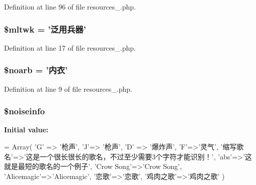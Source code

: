 Definition at line 96 of file resources\+\_.\+php.

\hypertarget{resources__1_8php_af12f55cfe5805f1081499f04e700478a}{
\subsubsection[{\$mltwk}]{\setlength{\rightskip}{0pt plus 5cm}\$mltwk = '泛用兵器'}}\label{resources__1_8php_af12f55cfe5805f1081499f04e700478a}


Definition at line 17 of file resources\+\_.\+php.

\hypertarget{resources__1_8php_a7042f4c981c7c1dd023648a96ee9a456}{
\subsubsection[{\$noarb}]{\setlength{\rightskip}{0pt plus 5cm}\$noarb = '内衣'}}\label{resources__1_8php_a7042f4c981c7c1dd023648a96ee9a456}


Definition at line 9 of file resources\+\_.\+php.

\hypertarget{resources__1_8php_a332324f513227af3ea62265b79326383}{
\subsubsection[{\$noiseinfo}]{\setlength{\rightskip}{0pt plus 5cm}\$noiseinfo}}\label{resources__1_8php_a332324f513227af3ea62265b79326383}
{\bfseries Initial value\+:}
\begin{DoxyCode}
= Array(
    \textcolor{charliteral}{'G'} => \textcolor{stringliteral}{'枪声'},
    \textcolor{charliteral}{'J'}=> \textcolor{stringliteral}{'枪声'},
    \textcolor{charliteral}{'D'} => \textcolor{stringliteral}{'爆炸声'},
    \textcolor{charliteral}{'F'}=>\textcolor{stringliteral}{'灵气'},
    \textcolor{stringliteral}{'缩写歌名'}=>\textcolor{stringliteral}{'这是一个很长很长的歌名，不过至少需要3个字符才能识别！'},
    \textcolor{stringliteral}{'abs'}=>\textcolor{stringliteral}{'这就是最短的歌名的一个例子'},
    \textcolor{stringliteral}{'Crow Song'}=>\textcolor{stringliteral}{'Crow Song'},
    \textcolor{stringliteral}{'Alicemagic'}=>\textcolor{stringliteral}{'Alicemagic'},
    \textcolor{stringliteral}{'恋歌'}=>\textcolor{stringliteral}{'恋歌'},
    \textcolor{stringliteral}{'鸡肉之歌'}=>\textcolor{stringliteral}{'鸡肉之歌'}
    )
\end{DoxyCode}


